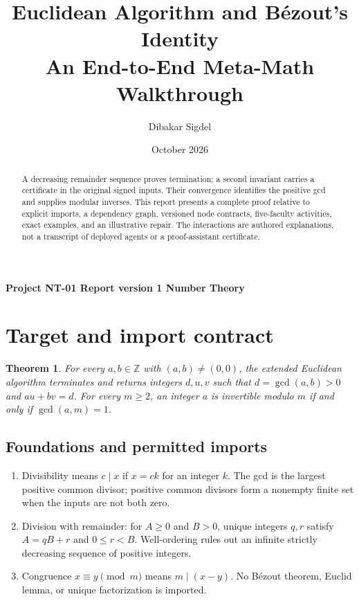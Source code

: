 \documentclass[preprint,12pt,aps,pra,showkeys,amsmath,amssymb,superscriptaddress,floatfix]{revtex4-2}
\newtheorem{theorem}{Theorem}[section]
\theoremstyle{definition}
\theoremstyle{remark}
\begin{document}
\title{Euclidean Algorithm and Bézout's Identity\\[4pt]\large An End-to-End Meta-Math Walkthrough}

\author{Dibakar Sigdel}


\date{October 2026}

\begin{abstract}

A decreasing remainder sequence proves termination; a second invariant
carries a certificate in the original signed inputs. Their convergence
identifies the positive gcd and supplies modular inverses. This report
presents a complete proof relative to explicit imports, a dependency
graph, versioned node contracts, five-faculty activities, exact
examples, and an illustrative repair. The interactions are authored
explanations, not a transcript of deployed agents or a proof-assistant
certificate.

\end{abstract}

\maketitle

\linespread{1.12}\selectfont

\noindent\textbf{Project NT-01 \quad Report version 1 \quad Number Theory}

\section{Target and import contract}

\begin{theorem}

For every \(a,b\in\mathbb Z\) with \((a,b)\ne(0,0)\), the extended
Euclidean algorithm terminates and returns integers \(d,u,v\) such that
\(d=\gcd(a,b)>0\) and \(au+bv=d\). For every \(m\ge2\), an integer \(a\)
is invertible modulo \(m\) if and only if \(\gcd(a,m)=1\).

\end{theorem}

\subsection{Foundations and permitted imports}

\begin{enumerate}
\def\labelenumi{\arabic{enumi}.}
\item
  Divisibility means \(c\mid x\) if \(x=ck\) for an integer \(k\). The
  gcd is the largest positive common divisor; positive common divisors
  form a nonempty finite set when the inputs are not both zero.
\item
  Division with remainder: for \(A\ge0\) and \(B>0\), unique integers
  \(q,r\) satisfy \(A=qB+r\) and \(0\le r<B\). Well-ordering rules out
  an infinite strictly decreasing sequence of positive integers.
\item
  Congruence \(x\equiv y\pmod m\) means \(m\mid(x-y)\). No Bézout
  theorem, Euclid lemma, or unique factorization is imported.
\end{enumerate}
\end{document}
